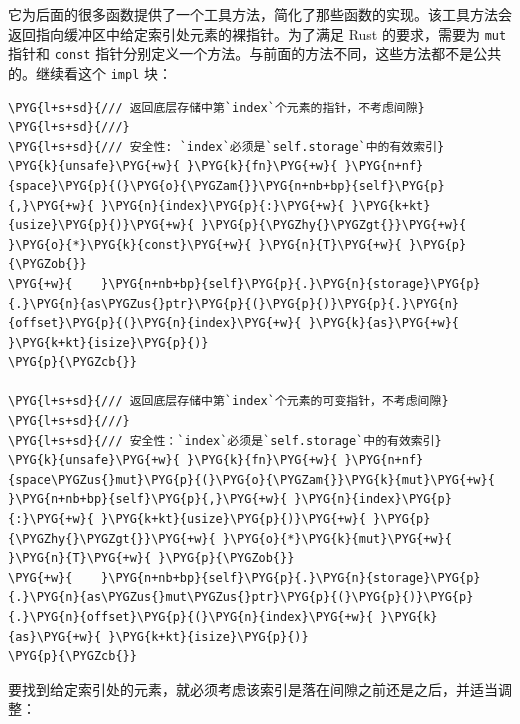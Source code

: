 它为后面的很多函数提供了一个工具方法，简化了那些函数的实现。该工具方法会返回指向缓冲区中给定索引处元素的裸指针。为了满足 Rust 的要求，需要为 \texttt{mut} 指针和 \texttt{const} 指针分别定义一个方法。与前面的方法不同，这些方法都不是公共的。继续看这个 \texttt{impl} 块：

\begin{Verbatim}[commandchars=\\\{\},breaklines=true,breakanywhere=true,fontsize=\codefont,xleftmargin=17bp]
\PYG{l+s+sd}{/// 返回底层存储中第`index`个元素的指针，不考虑间隙}
\PYG{l+s+sd}{///}
\PYG{l+s+sd}{/// 安全性: `index`必须是`self.storage`中的有效索引}
\PYG{k}{unsafe}\PYG{+w}{ }\PYG{k}{fn}\PYG{+w}{ }\PYG{n+nf}{space}\PYG{p}{(}\PYG{o}{\PYGZam{}}\PYG{n+nb+bp}{self}\PYG{p}{,}\PYG{+w}{ }\PYG{n}{index}\PYG{p}{:}\PYG{+w}{ }\PYG{k+kt}{usize}\PYG{p}{)}\PYG{+w}{ }\PYG{p}{\PYGZhy{}\PYGZgt{}}\PYG{+w}{ }\PYG{o}{*}\PYG{k}{const}\PYG{+w}{ }\PYG{n}{T}\PYG{+w}{ }\PYG{p}{\PYGZob{}}
\PYG{+w}{    }\PYG{n+nb+bp}{self}\PYG{p}{.}\PYG{n}{storage}\PYG{p}{.}\PYG{n}{as\PYGZus{}ptr}\PYG{p}{(}\PYG{p}{)}\PYG{p}{.}\PYG{n}{offset}\PYG{p}{(}\PYG{n}{index}\PYG{+w}{ }\PYG{k}{as}\PYG{+w}{ }\PYG{k+kt}{isize}\PYG{p}{)}
\PYG{p}{\PYGZcb{}}

\PYG{l+s+sd}{/// 返回底层存储中第`index`个元素的可变指针，不考虑间隙}
\PYG{l+s+sd}{///}
\PYG{l+s+sd}{/// 安全性：`index`必须是`self.storage`中的有效索引}
\PYG{k}{unsafe}\PYG{+w}{ }\PYG{k}{fn}\PYG{+w}{ }\PYG{n+nf}{space\PYGZus{}mut}\PYG{p}{(}\PYG{o}{\PYGZam{}}\PYG{k}{mut}\PYG{+w}{ }\PYG{n+nb+bp}{self}\PYG{p}{,}\PYG{+w}{ }\PYG{n}{index}\PYG{p}{:}\PYG{+w}{ }\PYG{k+kt}{usize}\PYG{p}{)}\PYG{+w}{ }\PYG{p}{\PYGZhy{}\PYGZgt{}}\PYG{+w}{ }\PYG{o}{*}\PYG{k}{mut}\PYG{+w}{ }\PYG{n}{T}\PYG{+w}{ }\PYG{p}{\PYGZob{}}
\PYG{+w}{    }\PYG{n+nb+bp}{self}\PYG{p}{.}\PYG{n}{storage}\PYG{p}{.}\PYG{n}{as\PYGZus{}mut\PYGZus{}ptr}\PYG{p}{(}\PYG{p}{)}\PYG{p}{.}\PYG{n}{offset}\PYG{p}{(}\PYG{n}{index}\PYG{+w}{ }\PYG{k}{as}\PYG{+w}{ }\PYG{k+kt}{isize}\PYG{p}{)}
\PYG{p}{\PYGZcb{}}
\end{Verbatim}

要找到给定索引处的元素，就必须考虑该索引是落在间隙之前还是之后，并适当调整：

